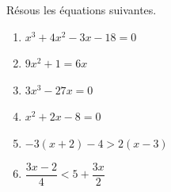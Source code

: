 %
%
    Résous les équations suivantes.
    \begin{enumerate}[cols=2]
        \item %
              $x^{3}+4x^{2}-3x -18=0$
        \item %
              $9x^{2}+1=6x$
        \item %
              $3x^{3}-27x=0$
        \item %
              $x^{2}+2x-8 =0$
        \item \(-3(x + 2)-4 > 2(x-3)\)
        \item \(\dfrac{3x-2}{4}<5 + \dfrac{3x}{2}\)
    \end{enumerate}
